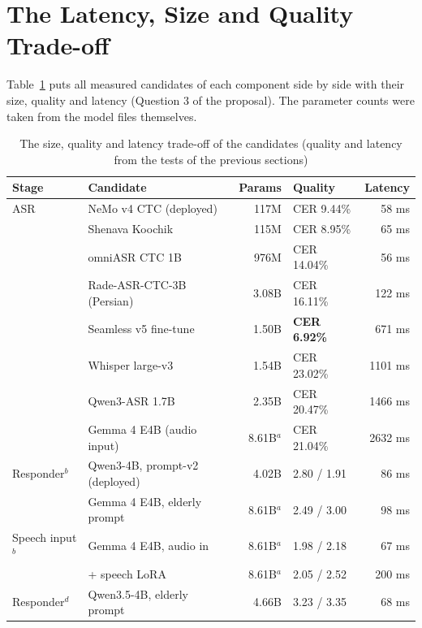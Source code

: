 
\section{The Latency, Size and Quality Trade-off}
\label{sec:res-tradeoff}

Table~\ref{tab:tradeoff} puts all measured candidates of each component side by side with their
size, quality and latency (Question 3 of the proposal). The parameter counts were taken from the
model files themselves.

\begin{table}[ht]
\centering
\caption{The size, quality and latency trade-off of the candidates (quality and latency from the
         tests of the previous sections)}
\label{tab:tradeoff}
\small
\setlength{\tabcolsep}{4.5pt}
\begin{tabular}{llrlr}
\toprule
Stage & Candidate & Params & Quality & Latency \\
\midrule
ASR & NeMo v4 CTC (deployed) & 117M & CER 9.44\% & 58 ms \\
 & Shenava Koochik & 115M & CER 8.95\% & 65 ms \\
 & omniASR CTC 1B & 976M & CER 14.04\% & 56 ms \\
 & Rade-ASR-CTC-3B (Persian) & 3.08B & CER 16.11\% & 122 ms \\
 & Seamless v5 fine-tune & 1.50B & \textbf{CER 6.92\%} & 671 ms \\
 & Whisper large-v3 & 1.54B & CER 23.02\% & 1101 ms \\
 & Qwen3-ASR 1.7B & 2.35B & CER 20.47\% & 1466 ms \\
 & Gemma 4 E4B (audio input) & 8.61B$^{a}$ & CER 21.04\% & 2632 ms \\
\midrule
Responder$^{b}$ & Qwen3-4B, prompt-v2 (deployed) & 4.02B & 2.80 / 1.91 & 86 ms \\
 & Gemma 4 E4B, elderly prompt & 8.61B$^{a}$ & 2.49 / 3.00 & 98 ms \\
Speech input$^{b}$ & Gemma 4 E4B, audio in & 8.61B$^{a}$ & 1.98 / 2.18 & 67 ms \\
 & + speech LoRA & 8.61B$^{a}$ & 2.05 / 2.52 & 200 ms \\
Responder$^{d}$ & Qwen3.5-4B, elderly prompt & 4.66B & 3.23 / 3.35 & 68 ms \\

\end{tabular}
\end{table}
